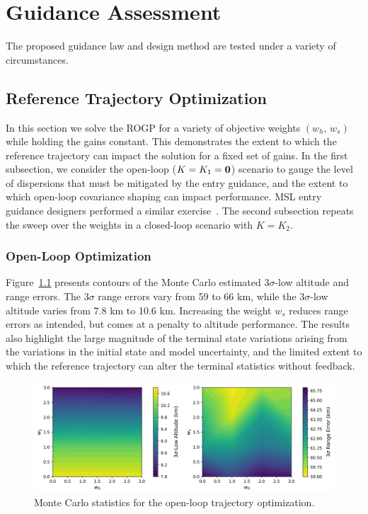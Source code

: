 \chapter{Guidance Assessment}\label{Ch:NumericalAssessment}
The proposed guidance law and design method are tested under a variety of circumstances. 

\section{Reference Trajectory Optimization}
In this section we solve the ROGP for a variety of objective weights $(w_h,\,w_s)$ while holding the gains constant. This demonstrates the extent to which the reference trajectory can impact the solution for a fixed set of gains. In the first subsection, we consider the open-loop ($K=K_1=\mathbf{0}$) scenario to gauge the level of dispersions that must be mitigated by the entry guidance, and the extent to which open-loop covariance shaping can impact performance. MSL entry guidance designers performed a similar exercise~\cite{MSL_EDL2}. The second subsection repeats the sweep over the weights in a closed-loop scenario with $K=K_2$.

\subsection{Open-Loop Optimization}
Figure~\ref{Fig:MCResultsOpenLoop} presents contours of the Monte Carlo estimated 3$\sigma$-low altitude and range errors. The 3$\sigma$ range errors vary from 59 to 66 km, while the 3$\sigma$-low altitude varies from 7.8 km to 10.6 km. Increasing the weight $w_s$ reduces range errors as intended, but comes at a penalty to altitude performance. The results also highlight the large magnitude of the terminal state variations arising from the variations in the initial state and model uncertainty, and the limited extent to which the reference trajectory can alter the terminal statistics without feedback.
\begin{figure}[h!]
	\centering
	\includegraphics[width=1\textwidth]{Images/OpenLoop_WeightSweepMCResults}
	\caption{Monte Carlo statistics for the open-loop trajectory optimization. }
	\label{Fig:MCResultsOpenLoop}
\end{figure}


